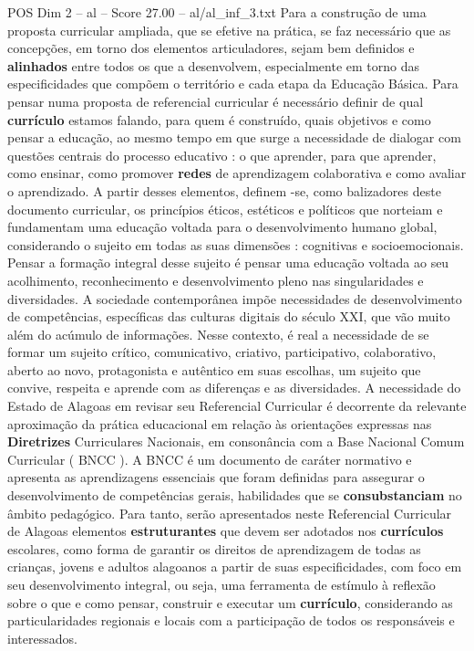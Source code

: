 \begin{textsample}{POS Dim 2 – al – Score 27.00 – al/al\_inf\_3.txt}
Para a construção de uma proposta curricular ampliada, que se efetive na prática, se faz necessário que as concepções, em torno dos elementos articuladores, sejam bem definidos e \textbf{alinhados} entre todos os que a desenvolvem, especialmente em torno das especificidades que compõem o território e cada etapa da Educação Básica.
Para pensar numa proposta de referencial curricular é necessário definir de qual \textbf{currículo} estamos falando, para quem é construído, quais objetivos e como pensar a educação, ao mesmo tempo em que surge a necessidade de dialogar com questões centrais do processo educativo : o que aprender, para que aprender, como ensinar, como promover \textbf{redes} de aprendizagem colaborativa e como avaliar o aprendizado.
A partir desses elementos, definem -se, como balizadores deste documento curricular, os princípios éticos, estéticos e políticos que norteiam e fundamentam uma educação voltada para o desenvolvimento humano global, considerando o sujeito em todas as suas dimensões : cognitivas e socioemocionais.
Pensar a formação integral desse sujeito é pensar uma educação voltada ao seu acolhimento, reconhecimento e desenvolvimento pleno nas singularidades e diversidades.
A sociedade contemporânea impõe necessidades de desenvolvimento de competências, específicas das culturas digitais do século XXI, que vão muito além do acúmulo de informações.
Nesse contexto, é real a necessidade de se formar um sujeito crítico, comunicativo, criativo, participativo, colaborativo, aberto ao novo, protagonista e autêntico em suas escolhas, um sujeito que convive, respeita e aprende com as diferenças e as diversidades.
A necessidade do Estado de Alagoas em revisar seu Referencial Curricular é decorrente da relevante aproximação da prática educacional em relação às orientações expressas nas \textbf{Diretrizes} Curriculares Nacionais, em consonância com a Base Nacional Comum Curricular ( BNCC ).
A BNCC é um documento de caráter normativo e apresenta as aprendizagens essenciais que foram definidas para assegurar o desenvolvimento de competências gerais, habilidades que se \textbf{consubstanciam} no âmbito pedagógico.
Para tanto, serão apresentados neste Referencial Curricular de Alagoas elementos \textbf{estruturantes} que devem ser adotados nos \textbf{currículos} escolares, como forma de garantir os direitos de aprendizagem de todas as crianças, jovens e adultos alagoanos a partir de suas especificidades, com foco em seu desenvolvimento integral, ou seja, uma ferramenta de estímulo à reflexão sobre o que e como pensar, construir e executar um \textbf{currículo}, considerando as particularidades regionais e locais com a participação de todos os responsáveis e interessados.

\end{textsample}
